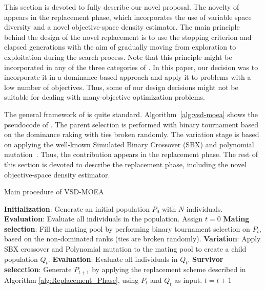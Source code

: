 
This section is devoted to fully describe our novel proposal.
%
The novelty of \VSDMOEA{} appears in the replacement phase, which incorporates
the use of variable space diversity and a novel objective-space density estimator. 
%
The main principle behind the design of the novel replacement is to use the stopping criterion and 
elapsed generations with the aim of gradually moving from exploration to exploitation during the search process.
%
Note that this principle might be incorporated in any of the three categories of \MOEAS{}.
%
In this paper, our decision was to incorporate it in a dominance-based approach and apply it to problems with 
a low number of objectives.
%
Thus, some of our design decisions might not be suitable for dealing with many-objective optimization problems.

The general framework of \VSDMOEA{} is quite standard.
%
Algorithm~\ref{alg:vsd-moea} shows the pseudocode of \VSDMOEA{}.
%
The parent selection is performed with binary tournament based on the dominance raking with ties broken randomly.
%
The variation stage is based on applying the well-known Simulated Binary Crossover (SBX) 
and polynomial mutation~\cite{Joel:SBX1994, Joel:Mutation}.
%
Thus, the contribution appears in the replacement phase.
%
The rest of this section is devoted to describe the replacement phase, including the novel objective-space density 
estimator.

\begin{algorithm}[t]
	\caption{Main procedure of VSD-MOEA} 
	\begin{small}
\begin{algorithmic}[1]
 	\STATE \textbf{Initialization}: Generate an initial population $P_0$ with $N$ individuals.
	\STATE \textbf{Evaluation}: Evaluate all individuals in the population.
	\STATE Assign $t=0$
	   \STATE \textbf{Mating selection}: Fill the mating pool by performing binary tournament selection on $P_t$, 
		 based on the non-dominated ranks (ties are broken randomly).
	   \STATE \textbf{Variation}: Apply SBX crossover and Polynomial mutation to the mating pool to create a child population $Q_t$.
		 \STATE \textbf{Evaluation}: Evaluate all individuals in $Q_t$.
	   \STATE \textbf{Survivor selecction}: Generate $P_{t+1}$ by applying the replacement scheme 
		 described in Algorithm \ref{alg:Replacement_Phase}, using $P_t$ and $Q_t$ as input.
	   \STATE $t=t+1$
	\ENDWHILE
	\end{algorithmic}
	\end{small}
\label{alg:vsd-moea}
\end{algorithm}


